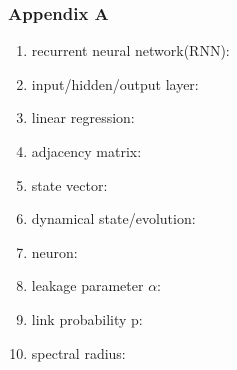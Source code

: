 \subsubsection{Appendix A}
\begin{enumerate}
  \item recurrent neural network(RNN):
  \item input/hidden/output layer: 
  \item linear regression: 
  \item adjacency matrix:
  \item state vector: 
  \item dynamical state/evolution: 
  \item neuron:
  \item leakage parameter $\alpha$:
  \item link probability p: 
  \item spectral radius:
\end{enumerate}

\clearpage